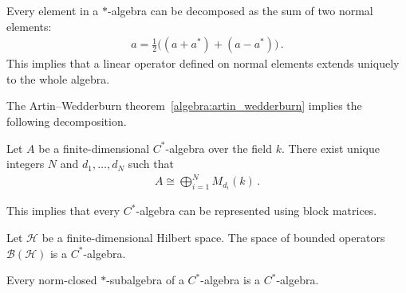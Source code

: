     \begin{property}
        Every element in a $\ast$-algebra can be decomposed as the sum of two normal elements:
        \begin{gather}
            a = \frac{1}{2}\bigl((a+a^*) + (a-a^*)\bigr)\,.
        \end{gather}
        This implies that a linear operator defined on normal elements extends uniquely to the whole algebra.
    \end{property}


    The Artin--Wedderburn theorem~\ref{algebra:artin_wedderburn} implies the following decomposition.
    \begin{theorem}
        Let $A$ be a finite-dimensional $C^*$-algebra over the field $k$. There exist unique integers $N$ and $d_1,\ldots,d_N$ such that
        \begin{gather}
            A\cong\bigoplus_{i=1}^NM_{d_i}(k)\,.
        \end{gather}
    \end{theorem}
    This implies that every $C^*$-algebra can be represented using block matrices.

    \begin{example}
        Let $\mathcal{H}$ be a finite-dimensional Hilbert space. The space of bounded operators $\mathcal{B}(\mathcal{H})$ is a $C^*$-algebra.
    \end{example}

    \begin{property}
        Every norm-closed $\ast$-subalgebra of a $C^*$-algebra is a $C^*$-algebra.
    \end{property}

